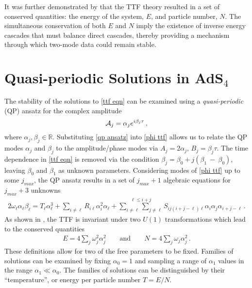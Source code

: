\documentclass[../PhD.tex]{subfiles}
\begin{document}
It was further demonstrated by \cite{1412.4761} that the TTF theory resulted in a set of conserved quantities: the energy of the system, $E$, and particle number, $N$. The simultaneous conservation of both $E$ and $N$ imply the existence of inverse energy cascades that must balance direct cascades, thereby providing a mechanism through which two-mode data could remain stable.


\section{Quasi-periodic Solutions in AdS$_4$}
\label{sec: qp}

The stability of the solutions to \eqref{ttf eqn} can be examined using a \emph{quasi-periodic} (QP) ansatz for the complex amplitude
\begin{align}
\label{qp ansatz}
\mathcal A_j = \alpha_j e^{i \beta_j \tau} \, ,
\end{align}
where $\alpha_j, \beta_j \in \mathbb{R}$. Substituting \eqref{qp ansatz} into \eqref{phi ttf} allows us to relate the QP modes $\alpha_j$ and $\beta_j$ to the amplitude/phase modes via $A_j = 2 \alpha_j$, $B_j = \beta_j \tau$. The time dependence in \eqref{ttf eqn} is removed via the condition $\beta_j = \beta_0 + j(\beta_1~-~\beta_0)$, leaving $\beta_0$ and $\beta_1$ as unknown parameters. Considering modes of \eqref{phi ttf} up to some $j_{max}$, the QP ansatz results in a set of $j_{max} + 1$ algebraic equations for $j_{max} + 3$ unknowns
\begin{align}
\label{qp eqn}
2 \omega_\ell \alpha_\ell \beta_\ell = T_\ell \alpha_\ell^3 + \sum_{i \neq \ell} R_{i\ell} \alpha_i^2 \alpha_\ell + \stackrel{\ell \leq i + j}{\sum_{i \neq \ell} \sum_{j \neq \ell}} S_{ij(i+j-\ell)\ell} \alpha_i \alpha_j \alpha_{i+j-\ell} \, .
\end{align}
As shown in \cite{1507.08261, 1510.07836}, the TTF is invariant under two $U(1)$ transformations which lead to the conserved quantities
\begin{align}
\label{qp cons}
E = 4\sum_j \omega^2_j \alpha_j^2 \qquad \text{and} \qquad N= 4 \sum_j \omega_j \alpha_j^2 \, .
\end{align}
These definitions allow for two of the free parameters to be fixed. Families of solutions can be examined by fixing $\alpha_0 = 1$ and sampling a range of $\alpha_1$ values in the range $\alpha_1 \ll \alpha_0$. The families of solutions can be distinguished by their ``temperature'', or energy per particle number $T=E/N$. 
\end{document}

